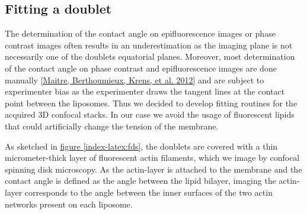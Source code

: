 \documentclass[A4paperpaper,11pt,english]{sphinxmanual}
\begin{document}
\subsection{Fitting a doublet}
\label{index-latex:fitting-a-doublet}
The determination of the contact angle on epifluorescence images or phase contrast
images often results in an underestimation as the imaging plane is not necessarily one of the doublets
equatorial planes. Moreover, most determination of the contact angle on phase
contrast and epifluorescence images are done manually {\hyperref[index-latex:maitre2012]{{[}Maitre, Berthoumieux, Krens,  et al.  2012{]}}} and
are subject to experimenter bias as the experimenter draws the tangent lines at the
contact point between the liposomes. Thus we decided to develop fitting routines for the acquired
3D confocal stacks. In our case we avoid the usage of
fluorescent lipids that could artificially change the tension of the membrane.

As sketched in \hyperref[index-latex:fds]{figure  \ref*{index-latex:fds}}, the doublets are covered with a
thin micrometer-thick layer of fluorescent actin filaments, which we
image by confocal spinning disk microscopy. As the actin-layer is attached to the membrane
and the contact angle is defined as the angle between the lipid bilayer, imaging the actin-layer corresponds
to the angle between the inner surfaces of the two actin networks present on each liposome.
\end{document}
